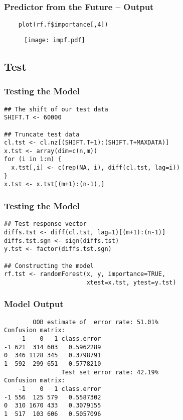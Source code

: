 \documentclass[utf8]{beamer}
\theoremstyle{definition}
\theoremstyle{remark}
\begin{document}
\begin{frame}[fragile]
  \frametitle{Predictor from the Future -- Output}
    \begin{lstlisting}
    plot(rf.f$importance[,4])
    \end{lstlisting}
    \begin{figure}
      \centering
      \texttt{[image: impf.pdf]}
      \label{fig:digraph}
    \end{figure}
\end{frame}

\subsection{Test}
\begin{frame}[fragile]
  \frametitle{Testing the Model}
    \begin{lstlisting}
## The shift of our test data
SHIFT.T <- 60000

## Truncate test data
cl.tst <- cl.nz[(SHIFT.T+1):(SHIFT.T+MAXDATA)]
x.tst <- array(dim=c(n,m))
for (i in 1:m) {
  x.tst[,i] <- c(rep(NA, i), diff(cl.tst, lag=i))
}
x.tst <- x.tst[(m+1):(n-1),]
    \end{lstlisting}
\end{frame}

\begin{frame}[fragile]
  \frametitle{Testing the Model}
    \begin{lstlisting}
## Test response vector
diffs.tst <- diff(cl.tst, lag=1)[(m+1):(n-1)]
diffs.tst.sgn <- sign(diffs.tst)
y.tst <- factor(diffs.tst.sgn)

## Constructing the model
rf.tst <- randomForest(x, y, importance=TRUE,
                       xtest=x.tst, ytest=y.tst)
    \end{lstlisting}
\end{frame}

\begin{frame}[fragile]
  \frametitle{Model Output}
    \begin{lstlisting}
        OOB estimate of  error rate: 51.01%
Confusion matrix:
    -1    0   1 class.error
-1 621  314 603   0.5962289
0  346 1128 345   0.3798791
1  592  299 651   0.5778210
                Test set error rate: 42.19%
Confusion matrix:
    -1    0   1 class.error
-1 556  125 579   0.5587302
0  310 1670 433   0.3079155
1  517  103 606   0.5057096
    \end{lstlisting}
\end{frame}
\end{document}
